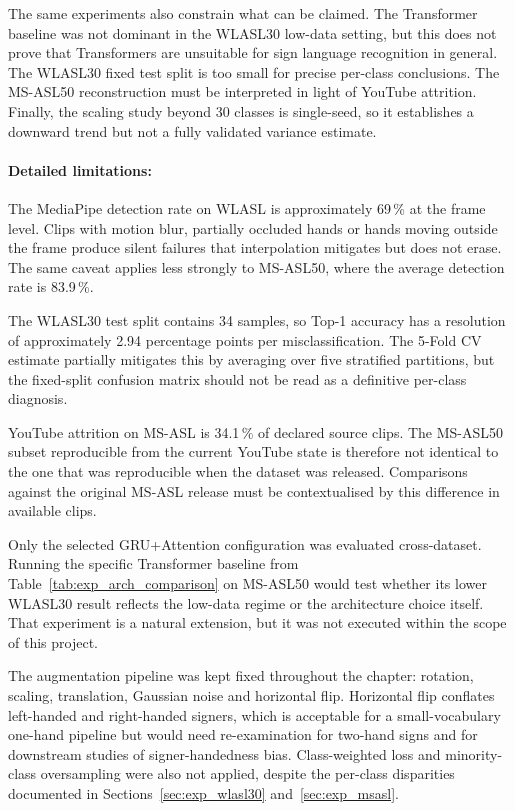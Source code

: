 The same experiments also constrain what can be claimed. The Transformer baseline was not dominant
in the WLASL30 low-data setting, but this does not prove that Transformers are unsuitable for sign
language recognition in general. The WLASL30 fixed test split is too small for precise per-class
conclusions. The MS-ASL50 reconstruction must be interpreted in light of YouTube attrition.
Finally, the scaling study beyond 30 classes is single-seed, so it establishes a downward trend but
not a fully validated variance estimate.

\paragraph{Detailed limitations:} The MediaPipe detection rate on WLASL is approximately 69\,\% at the frame level. Clips with motion
blur, partially occluded hands or hands moving outside the frame produce silent failures that
interpolation mitigates but does not erase. The same caveat applies less strongly to MS-ASL50,
where the average detection rate is 83.9\,\%.

The WLASL30 test split contains 34 samples, so Top-1 accuracy has a resolution of approximately
2.94 percentage points per misclassification. The 5-Fold CV estimate partially mitigates this by
averaging over five stratified partitions, but the fixed-split confusion matrix should not be read
as a definitive per-class diagnosis.

YouTube attrition on MS-ASL is 34.1\,\% of declared source clips. The MS-ASL50 subset reproducible
from the current YouTube state is therefore not identical to the one that was reproducible when the
dataset was released. Comparisons against the original MS-ASL release \cite{joze2019msasl} must be
contextualised by this difference in available clips.

Only the selected GRU+Attention configuration was evaluated cross-dataset. Running the specific
Transformer baseline from Table~\ref{tab:exp_arch_comparison} on MS-ASL50 would test whether its
lower WLASL30 result reflects the low-data regime or the architecture choice itself. That
experiment is a natural extension, but it was not executed within the scope of this project.

The augmentation pipeline was kept fixed throughout the chapter: rotation, scaling, translation,
Gaussian noise and horizontal flip. Horizontal flip conflates left-handed and right-handed signers,
which is acceptable for a small-vocabulary one-hand pipeline but would need re-examination for
two-hand signs and for downstream studies of signer-handedness bias. Class-weighted loss and
minority-class oversampling were also not applied, despite the per-class disparities documented in
Sections~\ref{sec:exp_wlasl30} and~\ref{sec:exp_msasl}.

